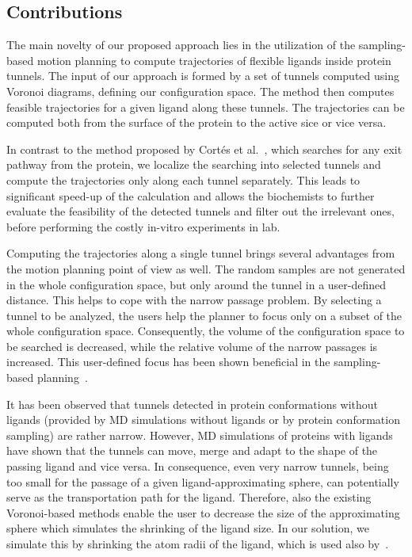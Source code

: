 \documentclass{bmcart}
\begin{document}
\subsection*{Contributions}

The main novelty of our proposed approach lies in the utilization of the sampling-based motion planning to compute trajectories of flexible ligands inside protein tunnels.
The input of our approach is formed by a set of tunnels computed using Voronoi diagrams, defining our configuration space.
The method then computes feasible trajectories for a given ligand along these tunnels. 
The trajectories can be computed both from the surface of the protein to the active sice or vice versa.


In contrast to the method proposed by Cort{\'e}s et al.~\cite{cortes2010simulating}, which searches for any exit pathway from the protein, we localize the searching into selected tunnels and compute the trajectories only along each tunnel separately.
This leads to significant speed-up of the calculation and allows the biochemists to further evaluate the feasibility of the detected tunnels and filter out the irrelevant ones, before performing the costly in-vitro experiments in lab.

Computing the trajectories along a single tunnel brings several advantages from the motion planning point of view as well.
The random samples are not generated in the whole configuration space, but only around the tunnel in a user-defined distance. 
This helps to cope with the narrow passage problem.
By selecting a tunnel to be analyzed, the users help the planner to focus only on a subset of the whole configuration
space. 
Consequently, the volume of the configuration space to be searched is decreased, while the relative volume of the narrow passages is increased.
This user-defined focus has been shown beneficial in the sampling-based planning~\cite{denny2018general}.

It has been observed that tunnels detected in protein conformations without ligands (provided by MD simulations without ligands or by
protein conformation sampling) are rather narrow. 
However, MD simulations of proteins with ligands have shown that the tunnels can move, merge and adapt to the shape of the passing ligand and vice versa.
In consequence, even very narrow tunnels, being too small for the passage of a given ligand-approximating sphere, can potentially serve as the transportation path for the ligand.
Therefore, also the existing Voronoi-based methods enable the user to decrease the size of the approximating sphere which simulates the shrinking of the ligand size.
In our solution, we simulate this by shrinking the atom radii of the ligand, which is used also by~\cite{cortes2010simulating,guieysse2008structure}.
\end{document}
